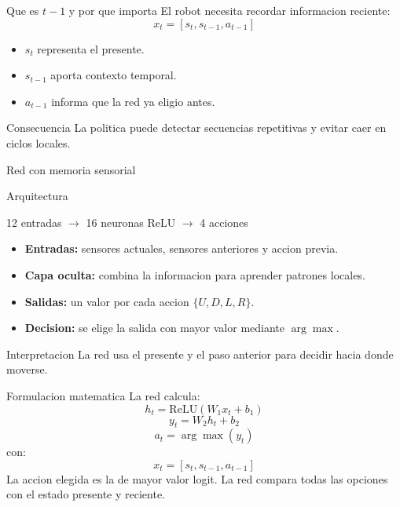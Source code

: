 \documentclass[aspectratio=169,11pt]{beamer}
\begin{document}
\begin{frame}{Que es $t-1$ y por que importa}
  El robot necesita recordar informacion reciente:
  \[
  x_t = [s_t, s_{t-1}, a_{t-1}]
  \]
  \begin{itemize}
    \item $s_t$ representa el presente.
    \item $s_{t-1}$ aporta contexto temporal.
    \item $a_{t-1}$ informa que la red ya eligio antes.
  \end{itemize}
  \vspace{0.2cm}
  \begin{alertblock}{Consecuencia}
    La politica puede detectar secuencias repetitivas y evitar caer en ciclos locales.
  \end{alertblock}
\end{frame}

\begin{frame}{Red con memoria sensorial}
  \begin{block}{Arquitectura}
    \begin{center}
      12 entradas $\longrightarrow$ 16 neuronas ReLU $\longrightarrow$ 4 acciones
    \end{center}
  \end{block}
  \begin{itemize}
    \item \textbf{Entradas:} sensores actuales, sensores anteriores y accion previa.
    \item \textbf{Capa oculta:} combina la informacion para aprender patrones locales.
    \item \textbf{Salidas:} un valor por cada accion $\{U,D,L,R\}$.
    \item \textbf{Decision:} se elige la salida con mayor valor mediante $\arg\max$.
  \end{itemize}
  \begin{alertblock}{Interpretacion}
    La red usa el presente y el paso anterior para decidir hacia donde moverse.
  \end{alertblock}
\end{frame}

\begin{frame}{Formulacion matematica}
  La red calcula:
  \[
  h_t = \mathrm{ReLU}(W_1 x_t + b_1)
  \]
  \[
  y_t = W_2 h_t + b_2
  \]
  \[
  a_t = \arg\max(y_t)
  \]
  con:
  \[
  x_t = [s_t, s_{t-1}, a_{t-1}]
  \]
  \vspace{0.3cm}
  La accion elegida es la de mayor valor logit. La red compara todas las opciones con el estado presente y reciente.
\end{frame}
\end{document}
